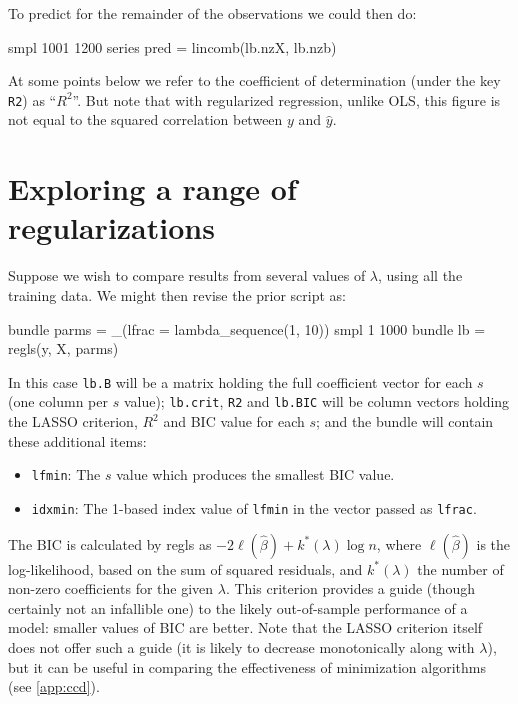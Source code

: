 \documentclass{article}
\begin{document}
To predict for the remainder of the observations we could then do:
\begin{code}
smpl 1001 1200
series pred = lincomb(lb.nzX, lb.nzb)
\end{code}

At some points below we refer to the coefficient of determination
(under the key \texttt{R2}) as ``$R^2$''. But note that with
regularized regression, unlike OLS, this figure is not equal to the
squared correlation between $y$ and $\hat{y}$.

\section{Exploring a range of regularizations}
\label{sec:simple-search}

Suppose we wish to compare results from several values of $\lambda$,
using all the training data. We might then revise the prior script as:
\begin{code}
bundle parms = _(lfrac = lambda_sequence(1, 10))
smpl 1 1000
bundle lb = regls(y, X, parms)
\end{code}

In this case \texttt{lb.B} will be a matrix holding the full
coefficient vector for each $s$ (one column per $s$ value);
\texttt{lb.crit}, \texttt{R2} and \texttt{lb.BIC} will be column
vectors holding the LASSO criterion, $R^2$ and BIC value for each
$s$; and the bundle will contain these additional items:
\begin{itemize}
\item \texttt{lfmin}: The $s$ value which produces the smallest BIC
  value.
\item \texttt{idxmin}: The 1-based index value of \texttt{lfmin} in
  the vector passed as \texttt{lfrac}.
\end{itemize}

The BIC \citep{schwarz78} is calculated by \textsf{regls} as
$-2\ell(\hat{\beta}) + k^*(\lambda) \log n$, where $\ell(\hat{\beta})$
is the log-likelihood, based on the sum of squared residuals, and
$k^*(\lambda)$ the number of non-zero coefficients for the given
$\lambda$. This criterion provides a guide (though certainly not an
infallible one) to the likely out-of-sample performance of a model:
smaller values of BIC are better. Note that the LASSO criterion itself
does not offer such a guide (it is likely to decrease monotonically
along with $\lambda$), but it can be useful in comparing the
effectiveness of minimization algorithms (see \ref{app:ccd}).
\end{document}
